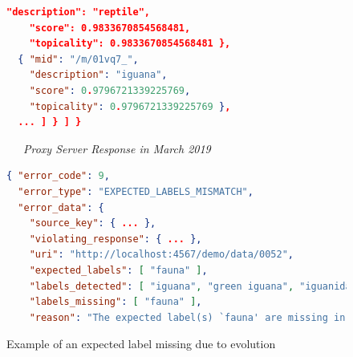 \begin{figure}
\begin{framed}
\begin{minipage}{\linewidth}
\begin{lstlisting}[language=json]
    "description": "reptile",
    "score": 0.9833670854568481,
    "topicality": 0.9833670854568481 },
  { "mid": "/m/01vq7_",
    "description": "iguana",
    "score": 0.9796721339225769,
    "topicality": 0.9796721339225769 },
  ... ] } ] }
        \end{lstlisting}
    \end{minipage}
    \begin{minipage}{\linewidth}
        \noindent\xrfill[0.45ex]{.5pt}~~~\textit{Proxy Server Response in March 2019}~~~\xrfill[0.45ex]{.5pt}
        \begin{lstlisting}[language=json]
{ "error_code": 9,
  "error_type": "EXPECTED_LABELS_MISMATCH",
  "error_data": {
    "source_key": { ... },
    "violating_response": { ... },
    "uri": "http://localhost:4567/demo/data/0052",
    "expected_labels": [ "fauna" ],
    "labels_detected": [ "iguana", "green iguana", "iguanidae", "lizard", "scaled reptile", "marine iguana", "terrestrial animal", "organism" ],
    "labels_missing": [ "fauna" ],
    "reason": "The expected label(s) `fauna' are missing in the response." } }
        \end{lstlisting}
    \end{minipage}
    \end{framed}
    \caption{Example of an expected label missing due to evolution}
    \label{fig:example-expected-labels}
\end{figure}












